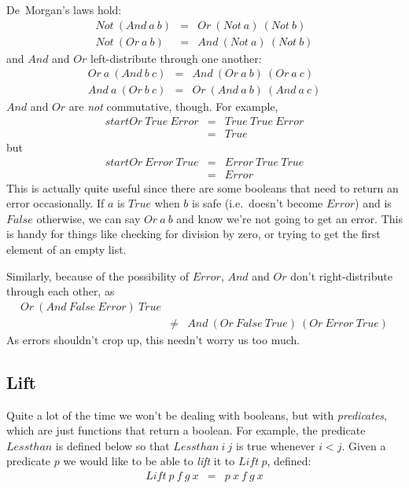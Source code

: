 De~Morgan's laws hold:
\begin{eqnarray*}
   Not~(And~a~b)  &  =  &  Or~(Not~a)~(Not~b)  \\
    Not~(Or~a~b)  &  =  &  And~(Not~a)~(Not~b)  
\end{eqnarray*}
and $And$ and $Or$ left-distribute through one another:
\begin{eqnarray*}
   Or~a~(And~b~c)  &  =  &  And~(Or~a~b)~(Or~a~c)  \\
   And~a~(Or~b~c)  &  =  &  Or~(And~a~b)~(And~a~c)
\end{eqnarray*}
$And$ and $Or$ are {\em not\/} commutative, though.  For example,
\begin{eqnarray*}
   start{Or~True~Error}  
   &  =  &  True~True~Error  \\
   &  =  &  True
\end{eqnarray*}
but
\begin{eqnarray*}
   start{Or~Error~True}  
   &  =  &  Error~True~True \\
   &  =  &  Error
\end{eqnarray*}
This is actually quite useful since there are some booleans that
need to return an error occasionally.  If $a$ is $True$ when $b$ 
is safe (i.e.\ doesn't become $Error$) and is $False$ otherwise, we can
say $Or~a~b$ and know we're not going to get an error.  This is handy
for things like checking for division by zero, or trying to get the
first element of an empty list.

Similarly, because of the possibility of $Error$,
$And$ and $Or$ don't right-distribute through each other,
as
\begin{eqnarray*}
    {Or~(And~False~Error)~True}\\
   &  \ne  &  And~(Or~False~True)~(Or~Error~True)
\end{eqnarray*}
As errors shouldn't crop up, this needn't worry us too much.
\begin{teX}
\def\And#1#2{#1{#2}\False}
\def\Or#1#2{#1\True{#2}}
\end{teX}



\subsection{Lift}

Quite a lot of the time we won't be dealing with booleans, but with
{\em predicates}, which are just functions that return a boolean.
For example, the predicate $Lessthan$ is defined below so that
$Lessthan~i~j$ is true whenever $i<j$.
Given a predicate $p$ we would like to be able to 
{\em lift\/} it to $Lift~p$, defined:
\begin{eqnarray*}
   Lift~p~f~g~x  &  =  &  p~x~f~g~x
\end{eqnarray*}

